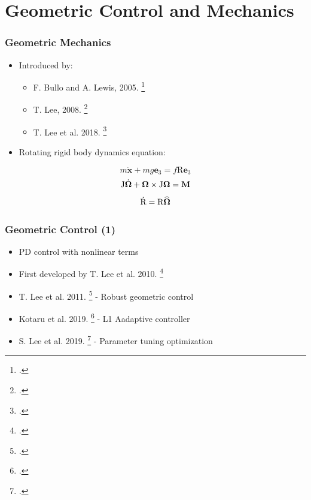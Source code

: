 \section{Geometric Control and Mechanics}

\begin{frame}
	\frametitle{Geometric Mechanics}
	
	\begin{itemize}
		\item Introduced by:
		\begin{itemize}
			\item F. Bullo and A. Lewis, 2005. \footcite{bulloBook}
			\item T. Lee, 2008. \footcite{Lee2008ComputationalGM}
			\item T. Lee et al. 2018. \footcite{LeeModel} 
		\end{itemize}
	
	\end{itemize}
	\begin{itemize}
		\item Rotating rigid body dynamics equation:
	\end{itemize}	
	\begin{equation}
		m \ddot{\textbf{x}} + m g\textbf{e}_3 = f\text{R}\textbf{e}_3 \label{model1}
	\end{equation}
	\begin{equation}
		\text{J}\dot{\boldsymbol{\Omega}} + \boldsymbol{\Omega} \times \text{J}\boldsymbol{\Omega} = \textbf{M} \label{model2}
	\end{equation}
	\begin{equation}                       
		\dot{\text{R}} = \text{R}\widehat{\boldsymbol{\Omega}} \label{model3}
	\end{equation}
	
\end{frame}

\begin{frame}
	\frametitle{Geometric Control (1)}

	\begin{itemize}
		\item PD control with nonlinear terms
		\item First developed by T. Lee et al. 2010. \footcite{LeeClanak4}
		\item  T. Lee et al. 2011. \footcite{LeeClanak3} - Robust geometric control
		\item Kotaru et al. 2019. \footcite{Kotaru2019GeometricLA} - L1 Aadaptive controller
		\item  S. Lee et al. 2019. \footcite{Lee2019} - Parameter tuning optimization
	\end{itemize}
\end{frame}

